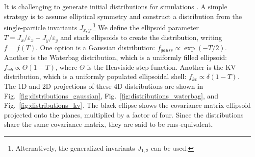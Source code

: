 It is challenging to generate initial distributions for simulations \cite{Lund2009}. A simple strategy is to assume elliptical symmetry and construct a distribution from the single-particle invariants $J_{x,y}$.\footnote{Alternatively, the generalized invariants $J_{1, 2}$ can be used.} We define the ellipsoid parameter $T = {J_x}/{\varepsilon_x} + {J_y}/{\varepsilon_y}$ and stack ellipsoids to create the distribution, writing $f = f(T)$. One option is a Gaussian distribution: $f_{gauss} \propto \exp(-T/2)$. Another is the Waterbag distribution, which is a uniformly filled ellipsoid: $f_{wb} \propto \Theta(1 - T)$, where $\Theta$ is the Heaviside step function. Another is the KV distribution, which is a uniformly populated ellipsoidal shell: $f_{kv} \propto \delta(1 - T)$. The 1D and 2D projections of these 4D distributions are shown in Fig.~\ref{fig:distributions_gaussian}, Fig.~\ref{fig:distributions_waterbag}, and Fig.~\ref{fig:distributions_kv}. The black ellipse shows the covariance matrix ellipsoid projected onto the planes, multiplied by a factor of four. Since the distributions share the same covariance matrix, they are said to be rms-equivalent.
%
